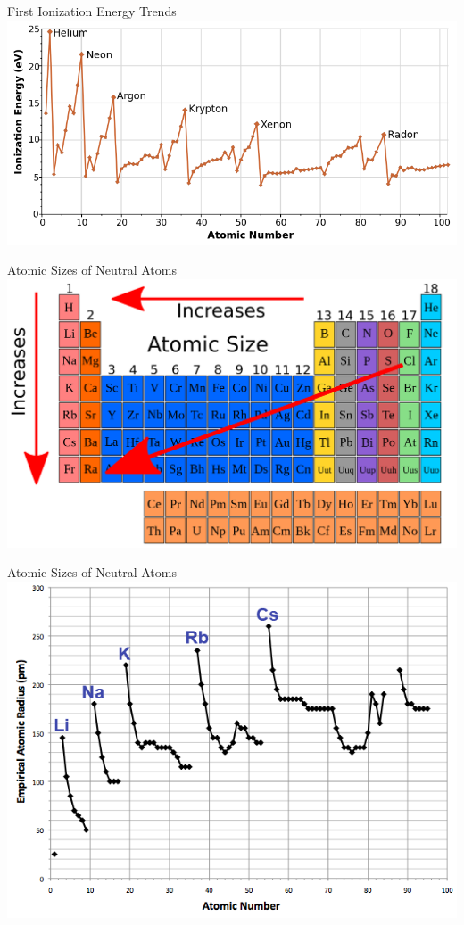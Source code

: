\documentclass[11pt]{beamer}
\begin{document}
\begin{frame}{First Ionization Energy Trends}
  \centering
  \includegraphics[width=\linewidth]{first-ionization-energy}
\end{frame}

\begin{frame}{Atomic Sizes of Neutral Atoms}
  \centering
  \includegraphics[width=\linewidth]{atomic_trend}
\end{frame}

\begin{frame}{Atomic Sizes of Neutral Atoms}
  \centering
  \includegraphics[width=\linewidth]{graph_atomic_rad}
\end{frame}
\end{document}
